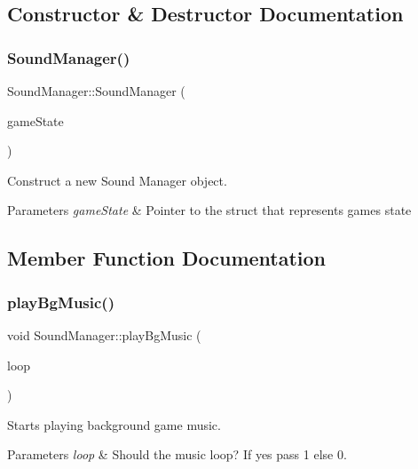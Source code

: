 \subsection{Constructor \& Destructor Documentation}
\mbox{\label{class_sound_manager_a92850e5896fef1d8529fb26a057d1e15}} 
\subsubsection{\texorpdfstring{SoundManager()}{SoundManager()}}
{\footnotesize\ttfamily Sound\+Manager\+::\+Sound\+Manager (\begin{DoxyParamCaption}\item[{\mbox{\hyperlink{struct_game_state}{Game\+State}} $\ast$}]{game\+State }\end{DoxyParamCaption})}



Construct a new Sound Manager object. 


\begin{DoxyParams}{Parameters}
{\em game\+State} & Pointer to the struct that represents game\textquotesingle{}s state \\
\hline
\end{DoxyParams}


\subsection{Member Function Documentation}
\mbox{\label{class_sound_manager_a80e41108d739852c94c563d3f96c7cd1}} 
\subsubsection{\texorpdfstring{playBgMusic()}{playBgMusic()}}
{\footnotesize\ttfamily void Sound\+Manager\+::play\+Bg\+Music (\begin{DoxyParamCaption}\item[{int}]{loop }\end{DoxyParamCaption})}



Starts playing background game music. 


\begin{DoxyParams}{Parameters}
{\em loop} & Should the music loop? If yes pass 1 else 0. \\
\hline
\end{DoxyParams}
\mbox{\label{class_sound_manager_a968f3c4811334fffe0f97809e7065722}} 
